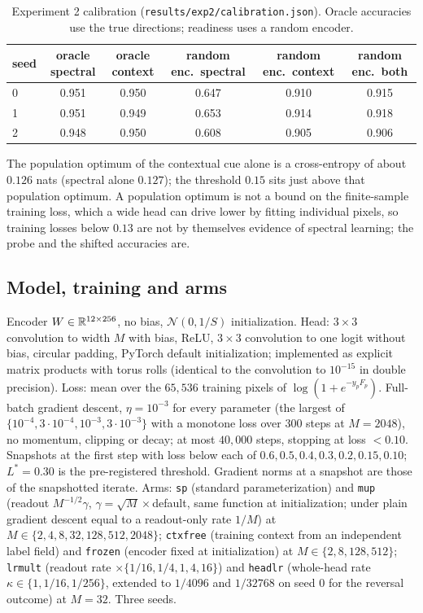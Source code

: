 \begin{table}[h]
\centering\small
\caption{Experiment 2 calibration (\texttt{results/exp2/calibration.json}).
Oracle accuracies use the true directions; readiness uses a random encoder.}
\label{tab:exp2_calib}
\begin{tabular}{lccccc}
\toprule
seed & oracle spectral & oracle context & random enc.\ spectral & random enc.\ context & random enc.\ both \\
\midrule
0 & 0.951 & 0.950 & 0.647 & 0.910 & 0.915 \\
1 & 0.951 & 0.949 & 0.653 & 0.914 & 0.918 \\
2 & 0.948 & 0.950 & 0.608 & 0.905 & 0.906 \\
\bottomrule
\end{tabular}
\end{table}

The population optimum of the contextual cue alone is a cross-entropy of
about $0.126$ nats (spectral alone $0.127$); the threshold $0.15$ sits
just above that population optimum. A population optimum is not a bound
on the finite-sample training loss, which a wide head can drive lower by
fitting individual pixels, so training losses below $0.13$ are not by
themselves evidence of spectral learning; the probe and the shifted
accuracies are.

\subsection{Model, training and arms}
Encoder $W\in\mathbb{R}^{12\times256}$, no bias, $\mathcal N(0,1/S)$ initialization.
Head: $3\times3$ convolution to width $M$ with bias, ReLU, $3\times3$
convolution to one logit without bias, circular padding, PyTorch default
initialization; implemented as explicit matrix products with torus rolls
(identical to the convolution to $10^{-15}$ in double precision). Loss: mean
over the $65{,}536$ training pixels of $\log(1+e^{-y_pF_p})$. Full-batch
gradient descent, $\eta=10^{-3}$ for every parameter (the largest of
$\{10^{-4},3\cdot10^{-4},10^{-3},3\cdot10^{-3}\}$ with a monotone loss over
$300$ steps at $M=2048$), no momentum, clipping or decay; at most $40{,}000$
steps, stopping at loss $<0.10$. Snapshots at the first step with loss below
each of $0.6,0.5,0.4,0.3,0.2,0.15,0.10$; $L^\ast=0.30$ is the pre-registered
threshold. Gradient norms at a snapshot are those of the snapshotted
iterate. Arms: \texttt{sp} (standard parameterization) and \texttt{mup}
(readout $M^{-1/2}\gamma$, $\gamma=\sqrt M\times$default, same function at
initialization; under plain gradient descent equal to a readout-only rate
$1/M$) at $M\in\{2,4,8,32,128,512,2048\}$; \texttt{ctxfree} (training
context from an independent label field) and \texttt{frozen} (encoder fixed
at initialization) at $M\in\{2,8,128,512\}$; \texttt{lrmult} (readout rate
$\times\{1/16,1/4,1,4,16\}$) and \texttt{headlr} (whole-head rate
$\kappa\in\{1,1/16,1/256\}$, extended to $1/4096$ and $1/32768$ on seed 0
for the reversal outcome) at $M=32$. Three seeds.

